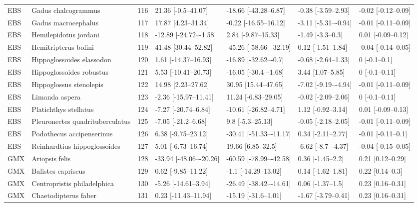 \begin{longtable}[t]{lllllll}
\addlinespace
EBS & Gadus chalcogrammus & 116 & 21.36 [-0.5–41.07] & -18.66 [-43.28–6.87] & -0.38 [-3.59–2.93] & -0.02 [-0.12–0.09]\\
EBS & Gadus macrocephalus & 117 & 17.87 [4.23–31.34] & -0.22 [-16.55–16.12] & -3.11 [-5.31–-0.94] & -0.01 [-0.11–0.09]\\
EBS & Hemilepidotus jordani & 118 & -12.89 [-24.72–-1.58] & 2.84 [-9.87–15.33] & -1.49 [-3.3–0.3] & 0.01 [-0.09–0.12]\\
EBS & Hemitripterus bolini & 119 & 41.48 [30.44–52.82] & -45.26 [-58.66–-32.19] & 0.12 [-1.51–1.84] & -0.04 [-0.14–0.05]\\
EBS & Hippoglossoides elassodon & 120 & 1.61 [-14.37–16.93] & -16.89 [-32.62–-0.7] & -0.68 [-2.64–1.33] & 0 [-0.1–0.1]\\
\addlinespace
EBS & Hippoglossoides robustus & 121 & 5.53 [-10.41–20.73] & -16.05 [-30.4–-1.68] & 3.44 [1.07–5.85] & 0 [-0.1–0.11]\\
EBS & Hippoglossus stenolepis & 122 & 14.98 [2.23–27.62] & 30.95 [15.44–47.65] & -7.02 [-9.19–-4.94] & -0.01 [-0.11–0.09]\\
EBS & Limanda aspera & 123 & -2.36 [-15.97–11.41] & 11.24 [-6.83–29.05] & -0.02 [-2.09–2.06] & 0 [-0.1–0.11]\\
EBS & Platichthys stellatus & 124 & -7.27 [-20.74–6.84] & -10.61 [-26.82–4.71] & 1.12 [-0.92–3.14] & 0.01 [-0.09–0.13]\\
EBS & Pleuronectes quadrituberculatus & 125 & -7.05 [-21.2–6.68] & 9.8 [-5.3–25.13] & -0.05 [-2.18–2.05] & -0.01 [-0.11–0.09]\\
\addlinespace
EBS & Podothecus accipenserinus & 126 & 6.38 [-9.75–23.12] & -30.41 [-51.33–-11.17] & 0.34 [-2.11–2.77] & -0.01 [-0.11–0.1]\\
EBS & Reinhardtius hippoglossoides & 127 & 5.01 [-6.73–16.74] & 19.66 [6.85–32.5] & -6.62 [-8.7–-4.37] & -0.04 [-0.15–0.05]\\
GMX & Ariopsis felis & 128 & -33.94 [-48.06–-20.26] & -60.59 [-78.99–-42.58] & 0.36 [-1.45–2.2] & 0.21 [0.12–0.29]\\
GMX & Balistes capriscus & 129 & 0.62 [-9.85–11.22] & -1.1 [-14.29–13.02] & 0.14 [-1.62–1.81] & 0.22 [0.14–0.3]\\
GMX & Centropristis philadelphica & 130 & -5.26 [-14.61–3.94] & -26.49 [-38.42–-14.61] & 0.06 [-1.37–1.5] & 0.23 [0.16–0.31]\\
\addlinespace
GMX & Chaetodipterus faber & 131 & 0.23 [-11.43–11.94] & -15.19 [-31.6–1.01] & -1.67 [-3.79–0.41] & 0.23 [0.16–0.31]\\

\end{longtable}
